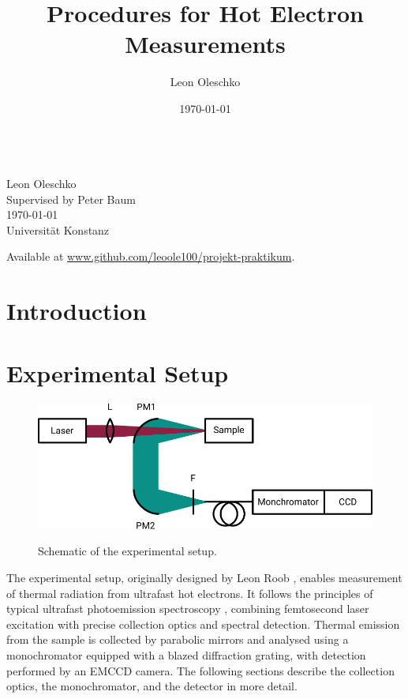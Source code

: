 \documentclass[
	parskip=half,
	a4paper,
]{scrarticle}
\begin{document}
\title{Procedures for Hot Electron Measurements}
\author{Leon Oleschko}
\date{\dotdate\today}

\begin{titlepage}
    \sffamily
    \vspace*{3cm}
    {
        \fontsize{32}{32}
    }
    \vspace{.25cm}\\
    {
        \Large
        Leon Oleschko\\
        Supervised by Peter Baum
        \vspace{.05cm}\\
        \dotdate\today\\
        Universität Konstanz
    }
    \vfill
    {
        \normalfont\normalsize

    }
    \vfill
    \begin{flushright}
        Available at \url{www.github.com/leoole100/projekt-praktikum}.
    \end{flushright}
\end{titlepage}


\clearpage


\section{Introduction}

\section{Experimental Setup}
\begin{figure}
    \centering
    \includegraphics{figures/setup.pdf}
    \label{fig:setup}
    \caption{Schematic of the experimental setup.}
\end{figure}
The experimental setup, originally designed by Leon Roob \autocite{roob_thermal_2025}, enables measurement of thermal radiation from ultrafast hot electrons. It follows the principles of typical ultrafast photoemission spectroscopy \autocite{lui_ultrafast_2010}, combining femtosecond laser excitation with precise collection optics and spectral detection. Thermal emission from the sample is collected by parabolic mirrors and analysed using a monochromator equipped with a blazed diffraction grating, with detection performed by an EMCCD camera. The following sections describe the collection optics, the monochromator, and the detector in more detail.
\end{document}
